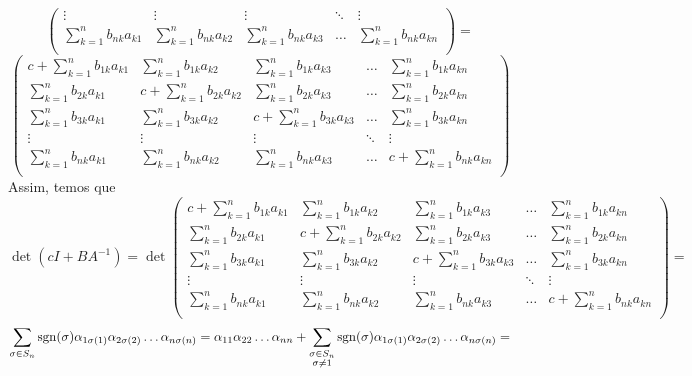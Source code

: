 \documentclass[11pt,a4paper]{article}
\begin{document}
{\[\begin{pmatrix}
\vdots & \vdots & \vdots & \ddots & \vdots \\
\sum\limits_{k = 1}^n b_{nk}a_{k1} & \sum\limits_{k = 1}^n b_{nk}a_{k2}  &\sum\limits_{k = 1}^n b_{nk}a_{k3}  & \ldots &\sum\limits_{k = 1}^n b_{nk}a_{kn} \\
\end{pmatrix} = \]\[ \begin{pmatrix}
c + \sum\limits_{k = 1}^n b_{1k}a_{k1} & \sum\limits_{k = 1}^n b_{1k}a_{k2}  &\sum\limits_{k = 1}^n b_{1k}a_{k3}  & \ldots &\sum\limits_{k = 1}^n b_{1k}a_{kn}  \\
\sum\limits_{k = 1}^n b_{2k}a_{k1} & c + \sum\limits_{k = 1}^n b_{2k}a_{k2}  &\sum\limits_{k = 1}^n b_{2k}a_{k3}  & \ldots &\sum\limits_{k = 1}^n b_{2k}a_{kn}  \\
\sum\limits_{k = 1}^n b_{3k}a_{k1} & \sum\limits_{k = 1}^n b_{3k}a_{k2}  &c + \sum\limits_{k = 1}^n b_{3k}a_{k3}  & \ldots &\sum\limits_{k = 1}^n b_{3k}a_{kn} \\
\vdots & \vdots & \vdots & \ddots & \vdots \\
\sum\limits_{k = 1}^n b_{nk}a_{k1} & \sum\limits_{k = 1}^n b_{nk}a_{k2}  &\sum\limits_{k = 1}^n b_{nk}a_{k3}  & \ldots &c + \sum\limits_{k = 1}^n b_{nk}a_{kn} \\
\end{pmatrix}
\]
Assim, temos que
\[
\det(cI + BA^{-1}) = \det \begin{pmatrix}
c + \sum\limits_{k = 1}^n b_{1k}a_{k1} & \sum\limits_{k = 1}^n b_{1k}a_{k2}  &\sum\limits_{k = 1}^n b_{1k}a_{k3}  & \ldots &\sum\limits_{k = 1}^n b_{1k}a_{kn}  \\
\sum\limits_{k = 1}^n b_{2k}a_{k1} & c + \sum\limits_{k = 1}^n b_{2k}a_{k2}  &\sum\limits_{k = 1}^n b_{2k}a_{k3}  & \ldots &\sum\limits_{k = 1}^n b_{2k}a_{kn}  \\
\sum\limits_{k = 1}^n b_{3k}a_{k1} & \sum\limits_{k = 1}^n b_{3k}a_{k2}  &c + \sum\limits_{k = 1}^n b_{3k}a_{k3}  & \ldots &\sum\limits_{k = 1}^n b_{3k}a_{kn} \\
\vdots & \vdots & \vdots & \ddots & \vdots \\
\sum\limits_{k = 1}^n b_{nk}a_{k1} & \sum\limits_{k = 1}^n b_{nk}a_{k2}  &\sum\limits_{k = 1}^n b_{nk}a_{k3}  & \ldots &c + \sum\limits_{k = 1}^n b_{nk}a_{kn} \\
\end{pmatrix} = 
\]
\[
\sum\limits_{\sigma \in S_n} {\rm sgn}(\sigma) \alpha_{1\sigma(1)}\alpha_{2\sigma(2)} \ldots \alpha_{n \sigma(n)} = \alpha_{11}\alpha_{22} \ldots \alpha_{nn} + \sum\limits_{\substack{\sigma \in S_n \\ \sigma \neq 1}} {\rm sgn}(\sigma) \alpha_{1\sigma(1)}\alpha_{2\sigma(2)} \ldots \alpha_{n \sigma(n)} =
\]}
\end{document}
